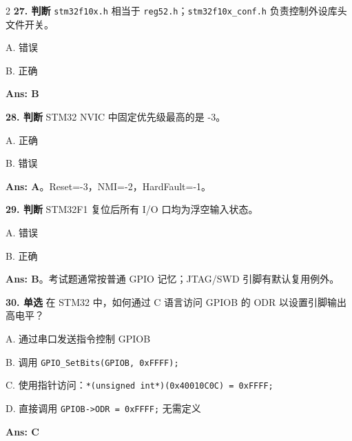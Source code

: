 \documentclass[UTF8,zihao=-5]{ctexart}
\begin{document}
\begin{multicols*}{2}
\textbf{27. 判断} \texttt{stm32f10x.h} 相当于 \texttt{reg52.h}；\texttt{stm32f10x\_conf.h} 负责控制外设库头文件开关。\par
A. 错误\par
B. 正确\par
\textbf{Ans: B}\par
\textbf{28. 判断} STM32 NVIC 中固定优先级最高的是 -3。\par
A. 正确\par
B. 错误\par
\textbf{Ans: A}。Reset=-3，NMI=-2，HardFault=-1。\par
\textbf{29. 判断} STM32F1 复位后所有 I/O 口均为浮空输入状态。\par
A. 错误\par
B. 正确\par
\textbf{Ans: B}。考试题通常按普通 GPIO 记忆；JTAG/SWD 引脚有默认复用例外。\par
\textbf{30. 单选} 在 STM32 中，如何通过 C 语言访问 GPIOB 的 ODR 以设置引脚输出高电平？\par
A. 通过串口发送指令控制 GPIOB\par
B. 调用 \texttt{GPIO\_SetBits(GPIOB, 0xFFFF);}\par
C. 使用指针访问：\texttt{*(unsigned int*)(0x40010C0C) = 0xFFFF;}\par
D. 直接调用 \texttt{GPIOB-\textgreater{}ODR = 0xFFFF;} 无需定义\par
\textbf{Ans: C}\par

\end{multicols*}
\end{document}
